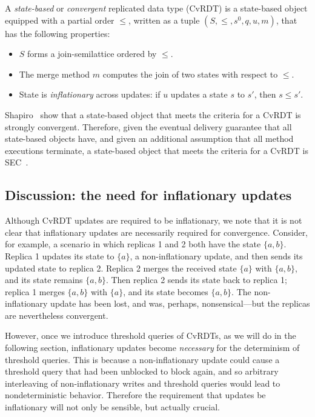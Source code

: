 A \emph{state-based} or \emph{convergent} replicated data type (CvRDT)
is a state-based object equipped with a partial order $\leq$, written
as a tuple
$(S, \leq, s^0, q, u, m)$, that has the following properties:
\begin{itemize}
\item $S$ forms a join-semilattice ordered by $\leq$.
\item The merge method $m$ computes the join of two
  states with respect to $\leq$.
\item State is \emph{inflationary} across updates: if $u$ updates a
  state $s$ to $s'$, then $s \leq s'$.
\end{itemize}
Shapiro \etal~show that a state-based object that meets the criteria
for a CvRDT is strongly convergent.  Therefore, given the eventual
delivery guarantee that all state-based objects have, and given an
additional assumption that all method executions terminate, a
state-based object that meets the criteria for a CvRDT is
SEC~\cite{crdts}.

\subsection{Discussion: the need for inflationary updates}

Although CvRDT updates are required to be inflationary, we note that
it is not clear that inflationary updates are necessarily required for
convergence.  Consider, for example, a scenario in which replicas 1
and 2 both have the state $\{a, b\}$. Replica 1 updates its state to
$\{a\}$, a non-inflationary update, and then sends its updated state
to replica 2.  Replica 2 merges the received state $\{a\}$ with $\{a,
b\}$, and its state remains $\{a, b\}$. Then replica 2 sends its state
back to replica 1; replica 1 merges $\{a, b\}$ with $\{a\}$, and its
state becomes $\{a, b\}$.  The non-inflationary update has been lost,
and was, perhaps, nonsensical---but the replicas are nevertheless
convergent.

However, once we introduce threshold queries of CvRDTs, as we will do
in the following section, inflationary updates become \emph{necessary}
for the determinism of threshold queries.  This is because a
non-inflationary update could cause a threshold query that had been
unblocked to block again, and so arbitrary interleaving of
non-inflationary writes and threshold queries would lead to
nondeterministic behavior.  Therefore the requirement that updates be
inflationary will not only be sensible, but actually crucial.

